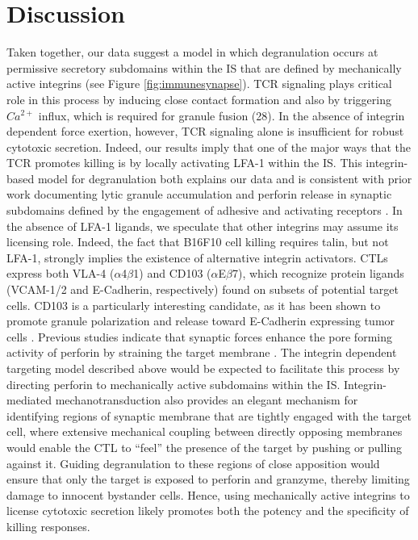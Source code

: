 \section{Discussion}
Taken together, our data suggest a model in which degranulation occurs at permissive secretory subdomains within the IS that are defined by mechanically active integrins (see Figure \ref{fig:immunesynapse}). TCR signaling plays critical role in this process by inducing close contact formation and also by triggering $Ca^{2+}$ influx, which is required for granule fusion \cite{Beal2009, Takayama1987} (28). In the absence of integrin dependent force exertion, however, TCR signaling alone is insufficient for robust cytotoxic secretion. Indeed, our results imply that one of the major ways that the TCR promotes killing is by locally activating LFA-1 within the IS. This integrin-based model for degranulation both explains our data and is consistent with prior work documenting lytic granule accumulation and perforin release in synaptic subdomains defined by the engagement of adhesive and activating receptors \cite{Houmadi2018, Verron2021}. In the absence of LFA-1 ligands, we speculate that other integrins may assume its licensing role. Indeed, the fact that B16F10 cell killing requires talin, but not LFA-1, strongly implies the existence of alternative integrin activators. CTLs express both VLA-4 ($\alpha$4$\beta$1) and CD103 ($\alpha$E$\beta$7), which recognize protein ligands (VCAM-1/2 and E-Cadherin, respectively) found on subsets of potential target cells. CD103 is a particularly interesting candidate, as it has been shown to promote granule polarization and release toward E-Cadherin expressing tumor cells \cite{LeFloch2007}. Previous studies indicate that synaptic forces enhance the pore forming activity of perforin by straining the target membrane \cite{Basu2016, Tamzalit2018}. The integrin dependent targeting model described above would be expected to facilitate this process by directing perforin to mechanically active subdomains within the IS. Integrin-mediated mechanotransduction also provides an elegant mechanism for identifying regions of synaptic membrane that are tightly engaged with the target cell, where extensive mechanical coupling between directly opposing membranes would enable the CTL to “feel” the presence of the target by pushing or pulling against it. Guiding degranulation to these regions of close apposition would ensure that only the target is exposed to perforin and granzyme, thereby limiting damage to innocent bystander cells. Hence, using mechanically active integrins to license cytotoxic secretion likely promotes both the potency and the specificity of killing responses. 

